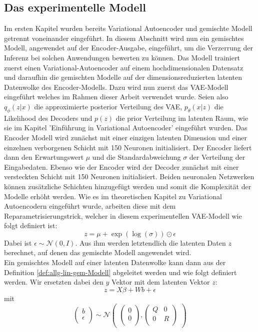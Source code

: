 \documentclass[%
thesis=student,%
coverpage=false,%
titlepage=false,%
headmarks=true, %
german,%
font=libertine, %
math=newpxtx, %
BCOR=5mm,%
coverBCOR=11mm%
]{tumbook}
\theoremstyle{break}
\begin{document}
\subsection{Das experimentelle Modell}
Im ersten Kapitel wurden bereits Variational Autoencoder und gemischte Modell getrennt voneinander eingeführt. In diesem Abschnitt wird nun ein gemischtes Modell, angewendet auf der Encoder-Ausgabe, eingeführt, um die Verzerrung der Inferenz bei solchen Anwendungen bewerten zu können. Das Modell trainiert zuerst einen Variational-Autoencoder auf einem hochdimensionalen Datensatz und daraufhin die gemischten Modelle auf der dimensionsreduzierten latenten Datenwolke des Encoder-Modells. Dazu wird nun zuerst das VAE-Modell eingeführt welches im Rahmen dieser Arbeit verwendet wurde. Seien also $q_\phi(z|x)$ die approximierte posterior Verteilung des VAE, $p_\theta(x|z)$ die Likelihood des Decoders und $p(z)$ die prior Verteilung im latenten Raum, wie sie im Kapitel 'Einführung in Variational Autoencoder' eingeführt wurden. Das Encoder Modell wird zunächst mit einer einzigen latenten Dimension und einer einzelnen verborgenen Schicht mit 150 Neuronen initialisiert. Der Encoder liefert dann den Erwartungswert $\mu$ und die Standardabweichung $\sigma$ der Verteilung der Eingabedaten. Ebenso wie der Encoder wird der Decoder zunächst mit einer versteckten Schicht mit 150 Neuronen initialisiert. Beiden neuronalen Netzwerken können zusätzliche Schichten hinzugefügt werden und somit die Komplexität der Modelle erhöht werden. 
Wie es im theoretischen Kapitel zu Variational Autoencodern eingeführt wurde, arbeiten diese mit dem Reparametrisierungstrick, welcher in diesem experimentellen VAE-Modell wie folgt definiert ist:
$$z = \mu + \exp(\log(\sigma)) \odot \epsilon$$  Dabei ist $\epsilon \sim \mathcal{N}(0,I)$. Aus ihm werden letztendlich die latenten Daten $z$ berechnet, auf denen das gemischte Modell angewendet wird.\\
Ein gemischtes Modell auf einer latenten Datenwolke kann dann aus der Definition \ref{def:allg-lin-gem-Modell} abgeleitet werden und wie folgt definiert werden. Wir ersetzten dabei den $y$ Vektor mit dem latenten Vektor $z$:
$$z = X\beta + Wb + \epsilon $$ \label{MM-auf-latentData}
mit
$$\begin{pmatrix}
		b \\
		\epsilon \\
\end{pmatrix}
\sim
\mathcal{N}
\begin{pmatrix}
\begin{pmatrix}		
	0 \\
	0 \\
\end{pmatrix},
\begin{pmatrix}
	Q & 0 \\
	0 & R \\
\end{pmatrix}
\end{pmatrix}$$
\end{document}
